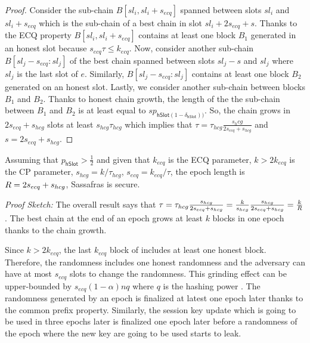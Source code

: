 \begin{proof}
	Consider the sub-chain $ B[sl_i,sl_i+s_{ecq}] $ spanned between slots $ sl_i $ and $ sl_i + s_{ecq} $  which is the sub-chain of a best chain in slot $ sl_i +  2s_{ecq} + s  $. Thanks to the ECQ property $ B[sl_i,sl_i+s_{ecq}] $ contains at least one block $ B_1 $ generated in an honest slot because  $ s_{ecq} \tau\leq k_{ecq} $.   Now, consider another sub-chain $ B[sl_j -s_{ecq} :sl_j] $ of the best chain spanned between slots $ sl_j - s $ and $ sl_j $ where $ sl_j $  is the last slot of $ e $. Similarly, $ B[sl_j -s_{ecq} :sl_j] $ contains at least one block $ B_2 $ generated on an honest slot. Lastly, we consider another sub-chain between blocks $ B_1 $ and $ B_2 $.  Thanks to honest chain growth, the length of the the sub-chain between $ B_1 $ and $ B_2 $ is at least equal to $ s p_{\mathsf{hSlot}(1-\delta_{\mathsf{hSlot}}))} $. So, the chain grows in $ 2s_{ecq} + s_{hcg} $ slots at least $ s_{hcg}\tau_{hcg} $ which implies that $ \tau = \tau_{hcg} \frac{s_hcg}{2 s_{ecq} + s_{hcg}} $ \cite{genesis} and $ s = 2s_{ecq} + s_{hcg} $. 
\end{proof}



\begin{theorem}
	Assuming that  $ p_{\mathsf{hSlot}} >\frac{1}{2}$ and given that  $k_{ecq}$ is the ECQ parameter, $k > 2k_{ecq}$ is the CP parameter, $s_{hcg} = k/\tau_{hcg}$, $s_{ecq} = k_{ecq}/\tau$, the epoch length is $R  = 2s_{ecq} + s_{hcg}$, Sassafras is secure.
\end{theorem}

\emph{Proof Sketch:}
The overall result says that $\tau = \tau_{hcg}\frac{s_{hcg}}{2s_{ecq}+s_{hcg}} = \frac{k}{s_{hcg}}\frac{s_{hcg}}{2s_{ecq}+s_{hcg}} = \frac{k}{R }$. The best chain at the end of an epoch grows at least $k$ blocks in one epoch thanks to the chain growth.

Since $k > 2k_{ecq}$, the last $k_{ecq}$ block of includes at least one honest block. Therefore, the randomness includes one honest randomness and the adversary can have at most $s_{ecq}$ slots to change the randomness. This grinding effect can be upper-bounded by $s_{ecq}(1-\alpha)nq$ where $q$ is the hashing power \cite{ouroboros}. The randomness generated by an epoch is finalized at latest one epoch later thanks to the common prefix property. Similarly, the session key update which is going to be used in three epochs later is finalized one epoch later before a randomness of the epoch where the new key are going to be used starts to leak.

